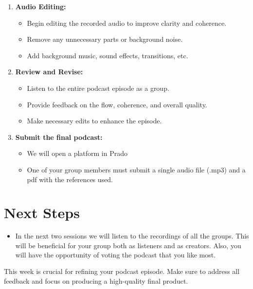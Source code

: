 \documentclass[
  letterpaper,
  DIV=11,
  numbers=noendperiod]{scrreprt}
\providecommand{\tightlist}{%
  \setlength{\itemsep}{0pt}\setlength{\parskip}{0pt}}\usepackage{longtable,booktabs,array}
\begin{document}
\begin{enumerate}
\def\labelenumi{\arabic{enumi}.}
\tightlist
\item
  \textbf{Audio Editing:}

  \begin{itemize}
  \tightlist
  \item
    Begin editing the recorded audio to improve clarity and coherence.
  \item
    Remove any unnecessary parts or background noise.
  \item
    Add background music, sound effects, transitions, etc.
  \end{itemize}
\item
  \textbf{Review and Revise:}

  \begin{itemize}
  \tightlist
  \item
    Listen to the entire podcast episode as a group.
  \item
    Provide feedback on the flow, coherence, and overall quality.
  \item
    Make necessary edits to enhance the episode.
  \end{itemize}
\item
  \textbf{Submit the final podcast:}

  \begin{itemize}
  \tightlist
  \item
    We will open a platform in Prado
  \item
    One of your group members must submit a single audio file (.mp3) and
    a pdf with the references used.
  \end{itemize}
\end{enumerate}

\section{Next Steps}\label{next-steps-11}

\begin{itemize}
\tightlist
\item
  In the next two sessions we will listen to the recordings of all the
  groups. This will be beneficial for your group both as listeners and
  as creators. Also, you will have the opportunity of voting the podcast
  that you like most.
\end{itemize}

This week is crucial for refining your podcast episode. Make sure to
address all feedback and focus on producing a high-quality final
product.
\end{document}
